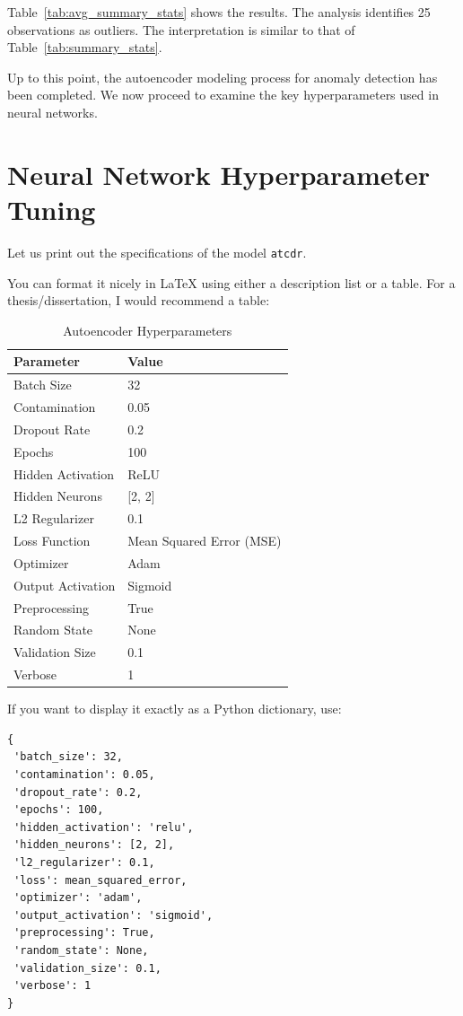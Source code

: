 Table~\ref{tab:avg_summary_stats} shows the results. The analysis identifies 25 observations as outliers. The interpretation is similar to that of Table~\ref{tab:summary_stats}.


Up to this point, the autoencoder modeling process for anomaly detection has been completed. We now proceed to examine the key hyperparameters used in neural networks.

\section{Neural Network Hyperparameter Tuning}

Let us print out the specifications of the model \texttt{atcdr}.



You can format it nicely in LaTeX using either a description list or a table. For a thesis/dissertation, I would recommend a table:

\begin{table}[htbp]
\centering
\caption{Autoencoder Hyperparameters}
\begin{tabular}{ll}
\hline
\textbf{Parameter} & \textbf{Value} \\
\hline
Batch Size & 32 \\
Contamination & 0.05 \\
Dropout Rate & 0.2 \\
Epochs & 100 \\
Hidden Activation & ReLU \\
Hidden Neurons & [2, 2] \\
L2 Regularizer & 0.1 \\
Loss Function & Mean Squared Error (MSE) \\
Optimizer & Adam \\
Output Activation & Sigmoid \\
Preprocessing & True \\
Random State & None \\
Validation Size & 0.1 \\
Verbose & 1 \\
\hline
\end{tabular}
\label{tab:autoencoder_hyperparameters}
\end{table}


If you want to display it exactly as a Python dictionary, use:

\begin{verbatim}
{
 'batch_size': 32,
 'contamination': 0.05,
 'dropout_rate': 0.2,
 'epochs': 100,
 'hidden_activation': 'relu',
 'hidden_neurons': [2, 2],
 'l2_regularizer': 0.1,
 'loss': mean_squared_error,
 'optimizer': 'adam',
 'output_activation': 'sigmoid',
 'preprocessing': True,
 'random_state': None,
 'validation_size': 0.1,
 'verbose': 1
}
\end{verbatim}




